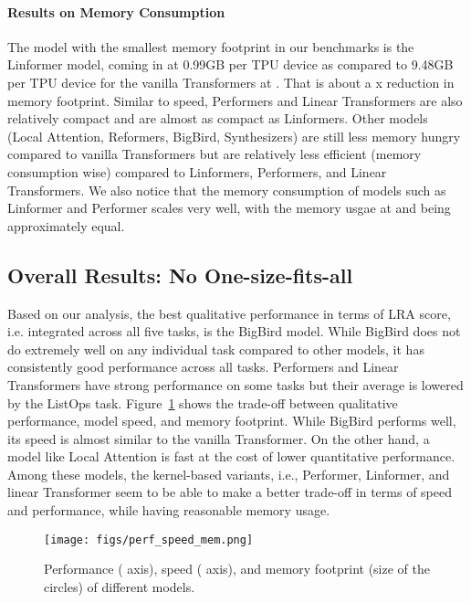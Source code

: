 \documentclass{article} \usepackage{iclr2021_conference,times}
\begin{document}
\paragraph{Results on Memory Consumption} The model with the smallest memory footprint in our benchmarks is the Linformer model, coming in at 0.99GB per TPU device as compared to 9.48GB per TPU device for the vanilla Transformers at . That is about a x reduction in memory footprint. Similar to speed, Performers and Linear Transformers are also relatively compact and are almost as compact as Linformers. Other models (Local Attention, Reformers, BigBird, Synthesizers) are still less memory hungry compared to vanilla Transformers but are relatively less efficient (memory consumption wise) compared to Linformers, Performers, and Linear Transformers. We also notice that the memory consumption of models such as Linformer and Performer scales very well, with the memory usgae at  and  being approximately equal.


\subsection{Overall Results: No One-size-fits-all} 

Based on our analysis, the best qualitative performance in terms of LRA score, i.e. integrated across all five tasks, is the BigBird model. While BigBird does not do extremely well on any individual task compared to other models, it has consistently good performance across all tasks. Performers and Linear Transformers have strong performance on some tasks but their average is lowered by the ListOps task. 
Figure~\ref{fig:perf_spped_mem} shows the trade-off between qualitative performance, model speed, and memory footprint. 
While BigBird performs well, its speed is almost similar to the vanilla Transformer. On the other hand, a model like Local Attention is fast at the cost of lower quantitative performance. 
Among these models, the kernel-based variants, i.e., Performer, Linformer, and linear Transformer seem to be able to make a better trade-off in terms of speed and performance, while having reasonable memory usage.




\begin{figure}[H]
   \centering
    \texttt{[image: figs/perf\_speed\_mem.png]}
    \caption{Performance ( axis), speed ( axis), and memory footprint (size of the circles) of different models.}
    \label{fig:perf_spped_mem}
\end{figure}
\end{document}
